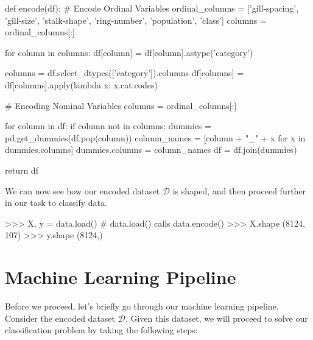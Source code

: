 \documentclass[fleqn]{article}
\begin{document}
    \begin{python}
def encode(df):
    # Encode Ordinal Variables
    ordinal_columns = ['gill-spacing', 'gill-size',
            'stalk-shape', 'ring-number', 'population', 'class']
    columns = ordinal_columns[:]

    for column in columns:
        df[column] = df[column].astype('category')

        columns = df.select_dtypes(['category']).columns
        df[columns] = df[columns].apply(lambda x: x.cat.codes)

    # Encoding Nominal Variables
    columns = ordinal_columns[:]

    for column in df:
        if column not in columns:
            dummies = pd.get_dummies(df.pop(column))
            column_names = [column + "_" + x for x in dummies.columns]
            dummies.columns = column_names
            df = df.join(dummies)

    return df
    \end{python}

    \noindent
    We can now see how our encoded dataset $ \mathcal{D} $ is shaped, and then proceed
    further in our task to classify data.

    \begin{python}
>>> X, y = data.load() # data.load() calls data.encode()
>>> X.shape
(8124, 107)
>>> y.shape
(8124,)
    \end{python}

    \section{Machine Learning Pipeline}
    Before we proceed, let's briefly go through our machine learning pipeline. Consider
    the encoded dataset $ \mathcal{D} $. Given this dataset, we will proceed to solve our
    classification problem by taking the following steps:
\end{document}
